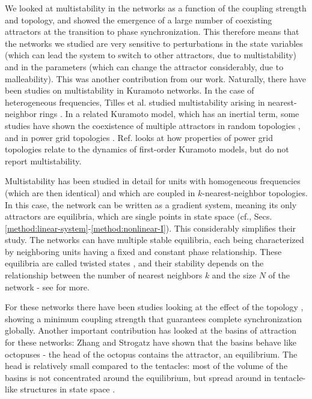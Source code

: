 We looked at multistability in the networks as a function of the coupling strength and topology, and showed the emergence of a large number of coexisting attractors at the transition to phase synchronization. This therefore means that the networks we studied are very sensitive to perturbations in the state variables (which can lead the system to switch to other attractors, due to multistability) and in the parameters (which can change the attractor considerably, due to malleability). This was another contribution from our work. Naturally, there have been studies on multistability in Kuramoto networks. In the case of heterogeneous frequencies, Tilles et al. studied multistability arising in nearest-neighbor rings \cite{tilles2011multistable}. In a related Kuramoto model, which has an inertial term, some studies have shown the coexistence of multiple attractors in random topologies \cite{gelbrecht2020monte}, and in power grid topologies \cite{hellmann2020network, halekotte2021transient}. Ref. \cite{potratzki2024synchronization} looks at how properties of power grid topologies relate to the dynamics of first-order Kuramoto models, but do not report multistability.

Multistability has been studied in detail for units with homogeneous frequencies (which are then identical) and which are coupled in $k$-nearest-neighbor topologies. In this case, the network can be written as a gradient system, meaning its only attractors are equilibria, which are single points in state space (cf., Secs. \ref{method:linear-system}-\ref{method:nonlinear-I}). This considerably simplifies their study. The networks can have multiple stable equilibria, each being characterized by neighboring units having a fixed and constant phase relationship. These equilibria are called twisted states \cite{wiley2006the}, and their stability depends on the relationship between the number of nearest neighbors $k$ and the size $N$ of the network \cite{wiley2006the} - see  for more.

For these networks there have been studies looking at the effect of the topology \cite{townsend2020dense}, showing a minimum coupling strength that guarantees complete synchronization globally. Another important contribution has looked at the basins of attraction for these networks: Zhang and Strogatz have shown that the basins behave like octopuses - the head of the octopus contains the attractor, an equilibrium. The head is relatively small compared to the tentacles: most of the volume of the basins is not concentrated around the equilibrium, but spread around in tentacle-like structures in state space \cite{zhang2021basins}. 

